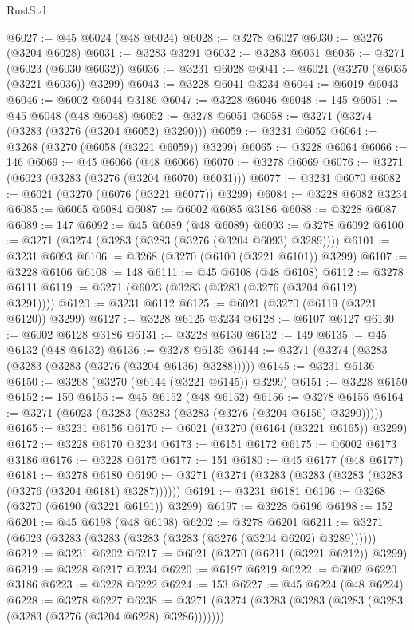 \begin{lexlean}{RustStd}
\begin{coremodule}
@6027 := @45 @6024 (@48 @6024)
@6028 := @3278 @6027
@6030 := @3276 (@3204 @6028)
@6031 := @3283 @3291
@6032 := @3283 @6031
@6035 := @3271 (@6023 (@6030 @6032))
@6036 := @3231 @6028
@6041 := @6021 (@3270 (@6035 (@3221 @6036)) @3299)
@6043 := @3228 @6041 @3234
@6044 := @6019 @6043
@6046 := @6002 @6044 @3186
@6047 := @3228 @6046
@6048 := 145
@6051 := @45 @6048 (@48 @6048)
@6052 := @3278 @6051
@6058 := @3271 (@3274 (@3283 (@3276 (@3204 @6052) @3290)))
@6059 := @3231 @6052
@6064 := @3268 (@3270 (@6058 (@3221 @6059)) @3299)
@6065 := @3228 @6064
@6066 := 146
@6069 := @45 @6066 (@48 @6066)
@6070 := @3278 @6069
@6076 := @3271 (@6023 (@3283 (@3276 (@3204 @6070) @6031)))
@6077 := @3231 @6070
@6082 := @6021 (@3270 (@6076 (@3221 @6077)) @3299)
@6084 := @3228 @6082 @3234
@6085 := @6065 @6084
@6087 := @6002 @6085 @3186
@6088 := @3228 @6087
@6089 := 147
@6092 := @45 @6089 (@48 @6089)
@6093 := @3278 @6092
@6100 := @3271 (@3274 (@3283 (@3283 (@3276 (@3204 @6093) @3289))))
@6101 := @3231 @6093
@6106 := @3268 (@3270 (@6100 (@3221 @6101)) @3299)
@6107 := @3228 @6106
@6108 := 148
@6111 := @45 @6108 (@48 @6108)
@6112 := @3278 @6111
@6119 := @3271 (@6023 (@3283 (@3283 (@3276 (@3204 @6112) @3291))))
@6120 := @3231 @6112
@6125 := @6021 (@3270 (@6119 (@3221 @6120)) @3299)
@6127 := @3228 @6125 @3234
@6128 := @6107 @6127
@6130 := @6002 @6128 @3186
@6131 := @3228 @6130
@6132 := 149
@6135 := @45 @6132 (@48 @6132)
@6136 := @3278 @6135
@6144 := @3271 (@3274 (@3283 (@3283 (@3283 (@3276 (@3204 @6136) @3288)))))
@6145 := @3231 @6136
@6150 := @3268 (@3270 (@6144 (@3221 @6145)) @3299)
@6151 := @3228 @6150
@6152 := 150
@6155 := @45 @6152 (@48 @6152)
@6156 := @3278 @6155
@6164 := @3271 (@6023 (@3283 (@3283 (@3283 (@3276 (@3204 @6156) @3290)))))
@6165 := @3231 @6156
@6170 := @6021 (@3270 (@6164 (@3221 @6165)) @3299)
@6172 := @3228 @6170 @3234
@6173 := @6151 @6172
@6175 := @6002 @6173 @3186
@6176 := @3228 @6175
@6177 := 151
@6180 := @45 @6177 (@48 @6177)
@6181 := @3278 @6180
@6190 := @3271 (@3274 (@3283 (@3283 (@3283 (@3283 (@3276 (@3204 @6181) @3287))))))
@6191 := @3231 @6181
@6196 := @3268 (@3270 (@6190 (@3221 @6191)) @3299)
@6197 := @3228 @6196
@6198 := 152
@6201 := @45 @6198 (@48 @6198)
@6202 := @3278 @6201
@6211 := @3271 (@6023 (@3283 (@3283 (@3283 (@3283 (@3276 (@3204 @6202) @3289))))))
@6212 := @3231 @6202
@6217 := @6021 (@3270 (@6211 (@3221 @6212)) @3299)
@6219 := @3228 @6217 @3234
@6220 := @6197 @6219
@6222 := @6002 @6220 @3186
@6223 := @3228 @6222
@6224 := 153
@6227 := @45 @6224 (@48 @6224)
@6228 := @3278 @6227
@6238 := @3271 (@3274 (@3283 (@3283 (@3283 (@3283 (@3283 (@3276 (@3204 @6228) @3286)))))))

\end{coremodule}
\end{lexlean}
